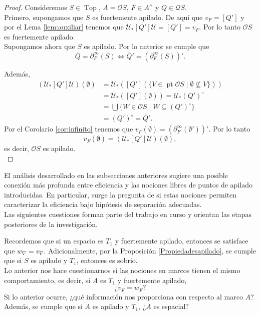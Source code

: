 \documentclass[12pt]{article}
\DeclareMathOperator{\Top}{Top}
\DeclareMathOperator{\pt}{pt}
\begin{document}
\begin{proof}
Consideremos $S\in \Top$, $A=\mathcal{O}S$, $F\in A^\wedge$ y $Q\in \mathcal{Q}S$.\\

Primero, supongamos que $S$ es fuertemente apilado. De aquí que $v_F=[Q']$ y por el Lema \ref{lem:auxiliar} tenemos que $\mathcal{U}_*[Q']\mathcal{U}=[Q']=v_F$. Por lo tanto $\mathcal{O}S$ es fuertemente apilado.\\

Supongamos ahora que $S$ es apilado. Por lo anterior se cumple que 
\[
\overline{Q}=\partial_F^\infty(S)\iff \overline{Q}'=(\partial_F^{\infty}(S))'.
\]

Además, 
\[
\begin{split}
(\mathcal{U}_*[Q']\mathcal{U})(\emptyset)&=\mathcal{U}_*([Q'](\{V\in \pt\mathcal{O}S\mid \emptyset \not\subseteq V\}))\\
&=\mathcal{U}_*([Q'](\emptyset))=\mathcal{U}_*(Q')^{\circ}\\
&=\bigcup\{W\in \mathcal{O}S\mid W\subseteq (Q')^\circ\}\\
&=(Q')^{\circ}=\overline{Q}'.
\end{split}
\]
Por el Corolario \ref{cor:infinito} tenemos que $v_F(\emptyset)=(\partial_F^\infty(\emptyset'))'$. Por lo tanto 
\[
v_F(\emptyset)=(\mathcal{U}_*[Q']\mathcal{U})(\emptyset),
\]
es decir, $\mathcal{O}S$ es apilado.\\
\end{proof}

El análisis desarrollado en las subsecciones anteriores sugiere una posible conexión más profunda entre eficiencia y las nociones 
libres de puntos de apilado introducidas. En particular, surge la pregunta de si estas nociones permiten caracterizar la eficiencia
bajo hipótesis de separación adecuadas.\\

Las siguientes cuestiones forman parte del trabajo en curso y orientan las etapas posteriores de la investigación.

Recordemos que si un espacio es $T_1$ y fuertemente apilado, entonces se satisface que $w_\nabla=v_\nabla$. Adicionalmente, por la Proposición \ref{Propiedadesapilado}, se cumple que
si $S$ es apilado y $T_1$, entonces es sobrio.\\

Lo anterior nos hace cuestionarnos si las nociones en marcos tienen el mismo comportamiento, es decir, si $A$ es $T_1$ y fuertemente apilado, 
\[
\text{¿}v_F=w_F?
\]
Si lo anterior ocurre, ¿qué información nos proporciona con respecto al marco $A$? Además, se cumple que si $A$ es 
apilado y $T_1$, ¿$A$ es espacial?\\
\end{document}
